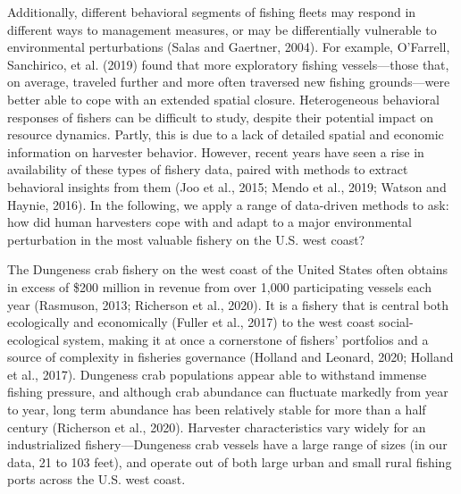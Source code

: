 \documentclass[]{elsarticle} %
\begin{document}
Additionally, different behavioral segments of fishing fleets may
respond in different ways to management measures, or may be
differentially vulnerable to environmental perturbations (Salas and
Gaertner, 2004). For example, O'Farrell, Sanchirico, et al. (2019) found
that more exploratory fishing vessels---those that, on average, traveled
further and more often traversed new fishing grounds---were better able
to cope with an extended spatial closure. Heterogeneous behavioral
responses of fishers can be difficult to study, despite their potential
impact on resource dynamics. Partly, this is due to a lack of detailed
spatial and economic information on harvester behavior. However, recent
years have seen a rise in availability of these types of fishery data,
paired with methods to extract behavioral insights from them (Joo et
al., 2015; Mendo et al., 2019; Watson and Haynie, 2016). In the
following, we apply a range of data-driven methods to ask: how did human
harvesters cope with and adapt to a major environmental perturbation in
the most valuable fishery on the U.S. west coast?

The Dungeness crab fishery on the west coast of the United States often
obtains in excess of \$200 million in revenue from over 1,000
participating vessels each year (Rasmuson, 2013; Richerson et al.,
2020). It is a fishery that is central both ecologically and
economically (Fuller et al., 2017) to the west coast social-ecological
system, making it at once a cornerstone of fishers' portfolios and a
source of complexity in fisheries governance (Holland and Leonard, 2020;
Holland et al., 2017). Dungeness crab populations appear able to
withstand immense fishing pressure, and although crab abundance can
fluctuate markedly from year to year, long term abundance has been
relatively stable for more than a half century (Richerson et al., 2020).
Harvester characteristics vary widely for an industrialized
fishery---Dungeness crab vessels have a large range of sizes (in our
data, 21 to 103 feet), and operate out of both large urban and small
rural fishing ports across the U.S. west coast.
\end{document}
